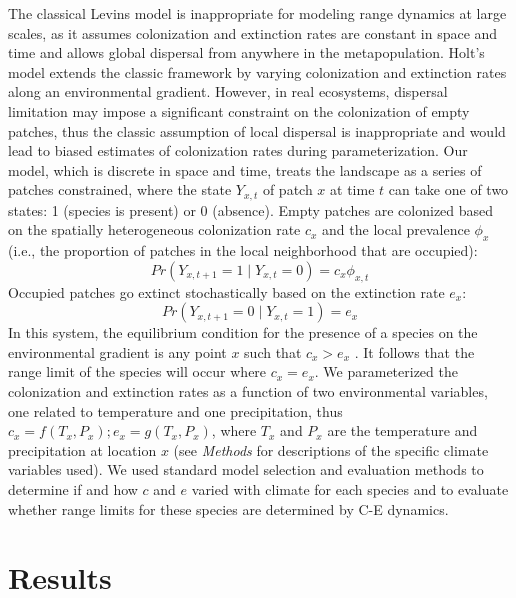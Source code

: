 \documentclass[11pt]{article}
\begin{document}
The classical Levins model is inappropriate for modeling range dynamics at large scales, as it assumes colonization and extinction rates are constant in space and time and allows global dispersal from anywhere in the metapopulation. 
Holt's model \cite{Holt2000} extends the classic framework by varying colonization and extinction rates along an environmental gradient.
However, in real ecosystems, dispersal limitation may impose a significant constraint on the colonization of empty patches, thus the classic assumption of local dispersal is inappropriate and would lead to biased estimates of colonization rates during parameterization.
Our model, which is discrete in space and time, treats the landscape as a series of patches constrained, where the state $Y_{x,t}$ of patch $x$ at time $t$ can take one of two states: 1 (species is present) or 0 (absence).
Empty patches are colonized based on the spatially heterogeneous colonization rate $c_x$ and the local prevalence $\phi_{x}$ (i.e., the proportion of patches in the local neighborhood that are occupied):
\begin{equation}
Pr(Y_{x,t+1} = 1 \mid Y_{x,t} = 0) = c_{x}\phi_{x,t}
\end{equation}
Occupied patches go extinct stochastically based on the extinction rate $e_x$:
\begin{equation}
Pr(Y_{x,t+1} = 0 \mid Y_{x,t} = 1) = e_{x}
\end{equation}
In this system, the equilibrium condition for the presence of a species on the environmental gradient is any point $x$ such that $c_x > e_x$ \cite{Holt2000}.
It follows that the range limit of the species will occur where $c_x = e_x$.
We parameterized the colonization and extinction rates as a function of two environmental variables, one related to temperature and one precipitation, thus $c_x = f(T_x, P_x); e_x = g(T_x, P_x)$, where $T_x$ and $P_x$ are the temperature and precipitation at location $x$ (see \emph{Methods} for descriptions of the specific climate variables used).
We used standard model selection and evaluation methods to determine if and how $c$ and $e$ varied with climate for each species and to evaluate whether range limits for these species are determined by C-E dynamics.


\section*{Results}
\end{document}
